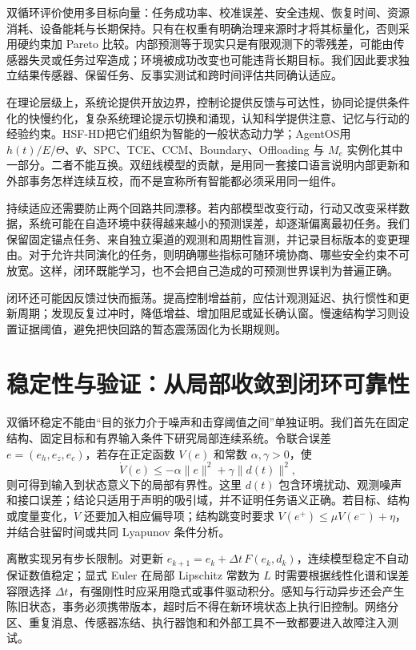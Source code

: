 双循环评价使用多目标向量：任务成功率、校准误差、安全违规、恢复时间、资源消耗、设备能耗与长期保持。只有在权重有明确治理来源时才将其标量化，否则采用硬约束加 Pareto 比较。内部预测等于现实只是有限观测下的零残差，可能由传感器失灵或任务过窄造成；环境被成功改变也可能违背长期目标。我们因此要求独立结果传感器、保留任务、反事实测试和跨时间评估共同确认适应。

在理论层级上，系统论提供开放边界，控制论提供反馈与可达性，协同论提供条件化的快慢约化，复杂系统理论提示切换和涌现，认知科学提供注意、记忆与行动的经验约束。HSF-HD把它们组织为智能的一般状态动力学；AgentOS用 $h(t)/E/\Theta$、$\Psi$、SPC、TCE、CCM、Boundary、Offloading 与 $M_e$ 实例化其中一部分。二者不能互换。双纽线模型的贡献，是用同一套接口语言说明内部更新和外部事务怎样连续互校，而不是宣称所有智能都必须采用同一组件。

持续适应还需要防止两个回路共同漂移。若内部模型改变行动，行动又改变采样数据，系统可能在自造环境中获得越来越小的预测误差，却逐渐偏离最初任务。我们保留固定锚点任务、来自独立渠道的观测和周期性盲测，并记录目标版本的变更理由。对于允许共同演化的任务，则明确哪些指标可随环境协商、哪些安全约束不可放宽。这样，闭环既能学习，也不会把自己造成的可预测世界误判为普遍正确。

闭环还可能因反馈过快而振荡。提高控制增益前，应估计观测延迟、执行惯性和更新周期；发现反复过冲时，降低增益、增加阻尼或延长确认窗。慢速结构学习则设置证据阈值，避免把快回路的暂态震荡固化为长期规则。

\section{稳定性与验证：从局部收敛到闭环可靠性}
\label{sec:section_5437}

双循环稳定不能由“目的张力介于噪声和击穿阈值之间”单独证明。我们首先在固定结构、固定目标和有界输入条件下研究局部连续系统。令联合误差 $e=(e_h,e_z,e_c)$，若存在正定函数 $V(e)$ 和常数 $\alpha,\gamma>0$，使
\[
\dot V(e)\le-\alpha\|e\|^2+\gamma\|d(t)\|^2,
\]
则可得到输入到状态意义下的局部有界性。这里 $d(t)$ 包含环境扰动、观测噪声和接口误差；结论只适用于声明的吸引域，并不证明任务语义正确。若目标、结构或度量变化，$\dot V$ 还要加入相应偏导项；结构跳变时要求 $V(e^+)\le\mu V(e^-)+\eta$，并结合驻留时间或共同 Lyapunov 条件分析。

离散实现另有步长限制。对更新 $e_{k+1}=e_k+\Delta t\,F(e_k,d_k)$，连续模型稳定不自动保证数值稳定；显式 Euler 在局部 Lipschitz 常数为 $L$ 时需要根据线性化谱和误差容限选择 $\Delta t$，有强刚性时应采用隐式或事件驱动积分。感知与行动异步还会产生陈旧状态，事务必须携带版本，超时后不得在新环境状态上执行旧控制。网络分区、重复消息、传感器冻结、执行器饱和和外部工具不一致都要进入故障注入测试。

